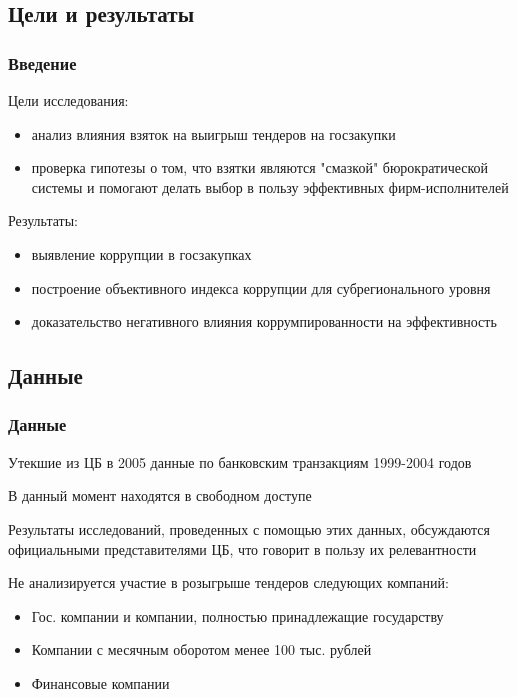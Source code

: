 \subsection{Цели и результаты}

\begin{frame}

\frametitle{Введение}
Цели исследования:\\ 

\begin{itemize}
\item анализ влияния взяток на выигрыш тендеров на госзакупки

\item проверка гипотезы о том, 
что взятки являются "смазкой" бюрократической системы и помогают делать выбор в пользу
эффективных фирм-исполнителей
\end{itemize}

\vspace{5mm}

Результаты:
\begin{itemize}

\item выявление коррупции в госзакупках

\item построение объективного индекса
коррупции для субрегионального уровня

\item доказательство негативного влияния коррумпированности на
эффективность

\end{itemize}

\end{frame}



\subsection{Данные}

\begin{frame}

\frametitle{Данные}
Утекшие из ЦБ в 2005 данные по банковским транзакциям 1999-2004 годов
\vspace{3mm}

В данный момент находятся в свободном доступе
\vspace{3mm}

Результаты исследований, проведенных с помощью этих данных, 
обсуждаются официальными представителями ЦБ,
что говорит в пользу их релевантности
\vspace{3mm}

Не анализируется участие в розыгрыше тендеров следующих компаний:
\begin{itemize}
\item Гос. компании и компании, полностью принадлежащие государству
\item Компании с месячным оборотом менее 100 тыс. рублей
\item Финансовые компании
\end{itemize}

\end{frame}